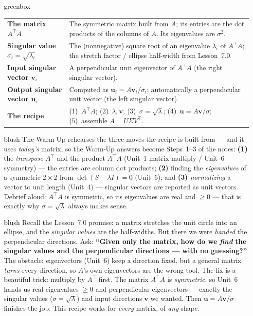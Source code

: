 \documentclass[10pt]{article}
\newcommand{\uu}{\mathbf{u}}
\newcommand{\vv}{\mathbf{v}}
\newcommand{\T}{^{\top}}
\begin{document}
\begin{skillbox}{greenbox}
\renewcommand{\arraystretch}{1.3}
\begin{tabularx}{\linewidth}{@{}l X@{}}
\textbf{The matrix $A\T A$} & The symmetric matrix built from $A$; its entries are the dot products of the columns of $A$. Its eigenvalues are $\sigma^2$. \\
\textbf{Singular value $\sigma_i=\sqrt{\lambda_i}$} & The (nonnegative) square root of an eigenvalue $\lambda_i$ of $A\T A$; the stretch factor / ellipse half-width from Lesson~7.0. \\
\textbf{Input singular vector $\vv_i$} & A perpendicular unit eigenvector of $A\T A$ (the right singular vector). \\
\textbf{Output singular vector $\uu_i$} & Computed as $\uu_i=A\vv_i/\sigma_i$; automatically a perpendicular unit vector (the left singular vector). \\
\textbf{The recipe} & (1)~$A\T A$; (2)~$\lambda,\vv$; (3)~$\sigma=\sqrt{\lambda}$; (4)~$\uu=A\vv/\sigma$; (5)~assemble $A=U\Sigma V\T$. \\
\end{tabularx}
\end{skillbox}

\begin{fixedskillbox}{blush}
    The Warm-Up rehearses the three moves the recipe is built from --- and it uses \emph{today's} matrix,
    so the Warm-Up answers become Steps~1--3 of the notes: \textbf{(1)} the \emph{transpose} $A\T$ and the
    product $A\T A$ (Unit~1 matrix multiply / Unit~6 symmetry) --- the entries are column dot products;
    \textbf{(2)} finding the \emph{eigenvalues} of a symmetric $2\times2$ from $\det(S-\lambda I)=0$
    (Unit~6); and \textbf{(3)} \emph{normalizing} a vector to unit length (Unit~4) --- singular vectors are
    reported as unit vectors. Debrief aloud: $A\T A$ is symmetric, so its eigenvalues are real and
    $\ge0$ --- that is exactly why $\sigma=\sqrt{\lambda}$ always makes sense.
\end{fixedskillbox}

\begin{skillbox}[Hook]{blush}
    Recall the Lesson~7.0 promise: a matrix stretches the unit circle into an ellipse, and the
    \emph{singular values} are the half-widths. But there we were \emph{handed} the perpendicular
    directions. Ask: \textbf{``Given only the matrix, how do we \emph{find} the singular values and the
    perpendicular directions --- with no guessing?''} The obstacle: eigenvectors (Unit~6) keep a
    direction fixed, but a general matrix \emph{turns} every direction, so $A$'s own eigenvectors are the
    wrong tool. The fix is a beautiful trick: multiply by $A\T$ first. The matrix $A\T A$ is
    \emph{symmetric}, so Unit~6 hands us real eigenvalues $\ge0$ and perpendicular eigenvectors ---
    exactly the singular values ($\sigma=\sqrt{\lambda}$) and input directions $\vv$ we wanted. Then
    $\uu=A\vv/\sigma$ finishes the job. This recipe works for \emph{every} matrix, of \emph{any} shape.
\end{skillbox}
\end{document}
